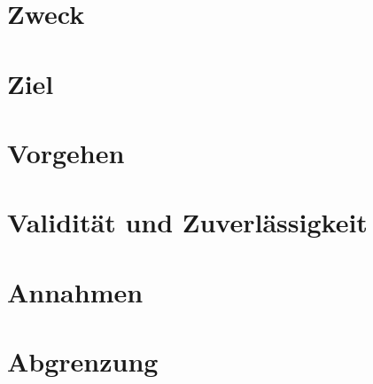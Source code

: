 \section{Zweck}

\section{Ziel}

\section{Vorgehen}

\section{Validität und Zuverlässigkeit}

\section{Annahmen}

\section{Abgrenzung}
